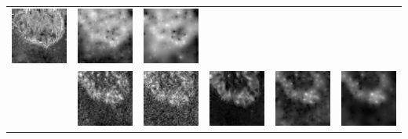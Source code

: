 \begin{tabular}{M{0.02cm}*{5}{M{2.4cm}}}
\includegraphics[width=2.3cm]{img/chapitre3/figure10/3-PCA+NLm_2.png}&
\includegraphics[width=2.3cm]{img/chapitre3/figure10/7-P2-S2N_2.png}&
\includegraphics[width=2.3cm]{img/chapitre3/figure10/8-P2-3S_2.png}\\
%
&
\includegraphics[width=2.3cm]{img/chapitre3/figure10/1-Full10ms_3.png}&
\includegraphics[width=2.3cm]{img/chapitre3/figure10/2-Full2ms_3.png}&
\includegraphics[width=2.3cm]{img/chapitre3/figure10/3-PCA+NLm_3.png}&
\includegraphics[width=2.3cm]{img/chapitre3/figure10/7-P2-S2N_3.png}&
\includegraphics[width=2.3cm]{img/chapitre3/figure10/8-P2-3S_3.png}\\
%
\end{tabular}
\egroup